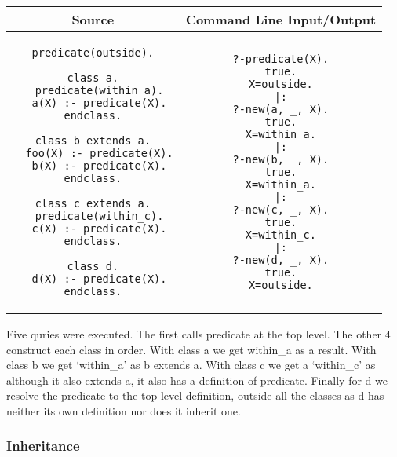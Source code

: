 \documentclass[12pt,a4paper,twoside,openright]{report}
\begin{document}
	\begin{center}
\begin{tabular}{c|c}
Source & Command Line Input/Output \\
\hline
	\small
\begin{lstlisting}
predicate(outside).

class a.
  predicate(within_a).
  a(X) :- predicate(X).
endclass.

class b extends a.
  foo(X) :- predicate(X).
  b(X) :- predicate(X).
endclass.

class c extends a.
  predicate(within_c).
  c(X) :- predicate(X).
endclass.

class d.
  d(X) :- predicate(X).
endclass.
\end{lstlisting}
&
	\small
\begin{lstlisting}
?-predicate(X).
true.
X=outside.
|:
?-new(a, _, X).
true.
X=within_a.
|:
?-new(b, _, X).
true.
X=within_a.
|:
?-new(c, _, X).
true.
X=within_c.
|:
?-new(d, _, X).
true.
X=outside.

\end{lstlisting}
\\
\end{tabular}
\end{center}

Five quries were executed. The first calls predicate at the top level. The other 4 construct each class in order. With class a we get within_a as a result. With class b we get `within_a' as b extends a. With class c we get a `within_c' as although it also extends a, it also has a definition of predicate. Finally for d we resolve the predicate to the top level definition, outside all the classes as d has neither its own definition nor does it inherit one.

\subsubsection{Inheritance}
	
\end{document}
